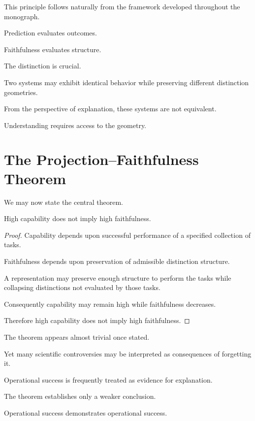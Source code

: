 \documentclass[11pt,oneside,openany]{book}
\begin{document}
This principle follows naturally from the framework developed throughout the monograph.

Prediction evaluates outcomes.

Faithfulness evaluates structure.

The distinction is crucial.

Two systems may exhibit identical behavior while preserving different distinction geometries.

From the perspective of explanation, these systems are not equivalent.

Understanding requires access to the geometry.

\section{The Projection--Faithfulness Theorem}

We may now state the central theorem.

\begin{theorem}

High capability does not imply high faithfulness.

\end{theorem}

\begin{proof}

Capability depends upon successful performance of a specified collection of tasks.

Faithfulness depends upon preservation of admissible distinction structure.

A representation may preserve enough structure to perform the tasks while collapsing distinctions not evaluated by those tasks.

Consequently capability may remain high while faithfulness decreases.

Therefore high capability does not imply high faithfulness.

\end{proof}

The theorem appears almost trivial once stated.

Yet many scientific controversies may be interpreted as consequences of forgetting it.

Operational success is frequently treated as evidence for explanation.

The theorem establishes only a weaker conclusion.

Operational success demonstrates operational success.
\end{document}
